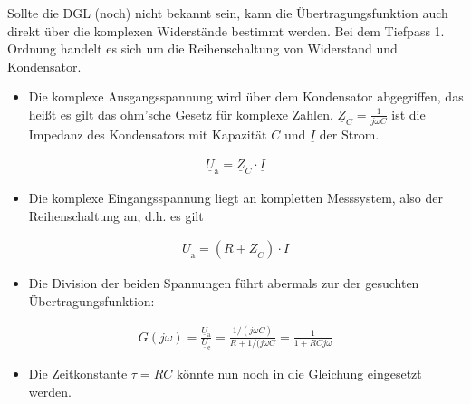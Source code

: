 \documentclass[letterpaper,10pt,english]{jupyterBook}
\begin{document}
\sphinxAtStartPar
{} Sollte die DGL (noch) nicht bekannt sein, kann die Übertragungsfunktion auch direkt über die komplexen Widerstände bestimmt werden. Bei dem Tiefpass 1. Ordnung handelt es sich um die Reihenschaltung von Widerstand und Kondensator.
\begin{itemize}
\item {} 
\sphinxAtStartPar
Die komplexe Ausgangsspannung wird über dem Kondensator abgegriffen, das heißt es gilt das ohm’sche Gesetz für komplexe Zahlen. \(\underline Z_C = \frac{1}{j\omega C}\) ist die Impedanz des Kondensators mit Kapazität \(C\) und \(\underline I\) der Strom.

\end{itemize}
\begin{equation*}
\begin{split}\underline U_\mathrm a = \underline Z_C \cdot \underline I\end{split}
\end{equation*}\begin{itemize}
\item {} 
\sphinxAtStartPar
Die komplexe Eingangsspannung liegt an kompletten Messsystem, also der Reihenschaltung an, d.h. es gilt

\end{itemize}
\begin{equation*}
\begin{split}\underline U_\mathrm a = (R+ \underline Z_C) \cdot \underline I\end{split}
\end{equation*}\begin{itemize}
\item {} 
\sphinxAtStartPar
Die Division der beiden Spannungen führt abermals zur der gesuchten Übertragungsfunktion:

\end{itemize}
\begin{equation*}
\begin{split}G(j \omega) = \frac{\underline U_\mathrm a}{\underline U_\mathrm e} = \frac{1/(j\omega C)}{R + 1/(j\omega C} = \frac{1}{1+RC j \omega}\end{split}
\end{equation*}\begin{itemize}
\item {} 
\sphinxAtStartPar
Die Zeitkonstante \(\tau = RC\) könnte nun noch in die Gleichung eingesetzt werden.

\end{itemize}
\end{document}
